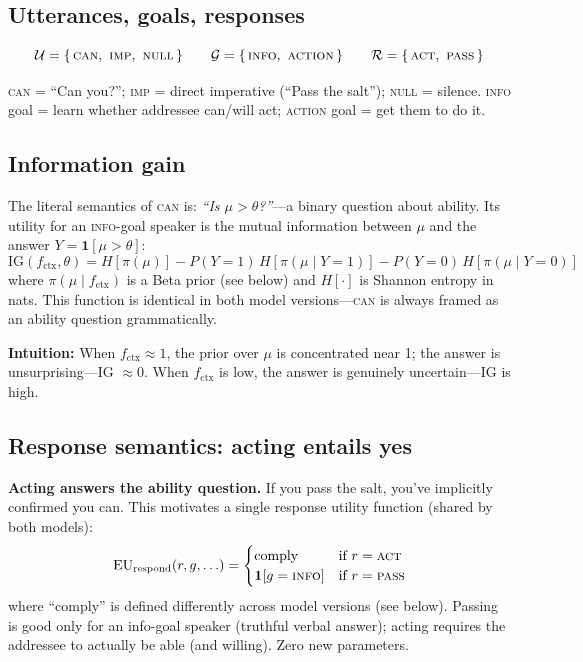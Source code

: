 \documentclass[11pt]{article}
\begin{document}
\subsection{Utterances, goals, responses}

\[
  \mathcal{U} = \{\,\textsc{can},\ \textsc{imp},\ \textsc{null}\,\}
  \qquad
  \mathcal{G} = \{\,\textsc{info},\ \textsc{action}\,\}
  \qquad
  \mathcal{R} = \{\,\textsc{act},\ \textsc{pass}\,\}
\]

\textsc{can} = ``Can you?''; \textsc{imp} = direct imperative (``Pass the salt'');
\textsc{null} = silence. \textsc{info} goal = learn whether addressee can/will act;
\textsc{action} goal = get them to do it.

\subsection{Information gain}

The literal semantics of \textsc{can} is: \emph{``Is $\mu > \theta$?''}---a
binary question about ability. Its utility for an \textsc{info}-goal speaker
is the mutual information between $\mu$ and the answer $Y = \mathbf{1}[\mu > \theta]$:
\[
  \mathrm{IG}(f_{\text{ctx}}, \theta)
  = H\!\left[\pi(\mu)\right]
  - P(Y{=}1)\, H\!\left[\pi(\mu \mid Y{=}1)\right]
  - P(Y{=}0)\, H\!\left[\pi(\mu \mid Y{=}0)\right]
\]
where $\pi(\mu \mid f_{\text{ctx}})$ is a Beta prior (see below) and
$H[\cdot]$ is Shannon entropy in nats. This function is identical in both model
versions---\textsc{can} is always framed as an ability question grammatically.

\textbf{Intuition:} When $f_{\text{ctx}} \approx 1$, the prior over $\mu$ is
concentrated near 1; the answer is unsurprising---IG $\approx 0$. When
$f_{\text{ctx}}$ is low, the answer is genuinely uncertain---IG is high.

\subsection{Response semantics: acting entails yes}

\textbf{Acting answers the ability question.} If you pass the salt, you've implicitly
confirmed you can. This motivates a single response utility function (shared by both models):
\[
  \mathrm{EU}_{\text{respond}}(r, g, \ldots) =
  \begin{cases}
    \text{comply} & \text{if } r = \textsc{act} \\
    \mathbf{1}[g = \textsc{info}] & \text{if } r = \textsc{pass}
  \end{cases}
\]
where ``comply'' is defined differently across model versions (see below).
Passing is good only for an info-goal speaker (truthful verbal answer); acting
requires the addressee to actually be able (and willing). Zero new parameters.
\end{document}
